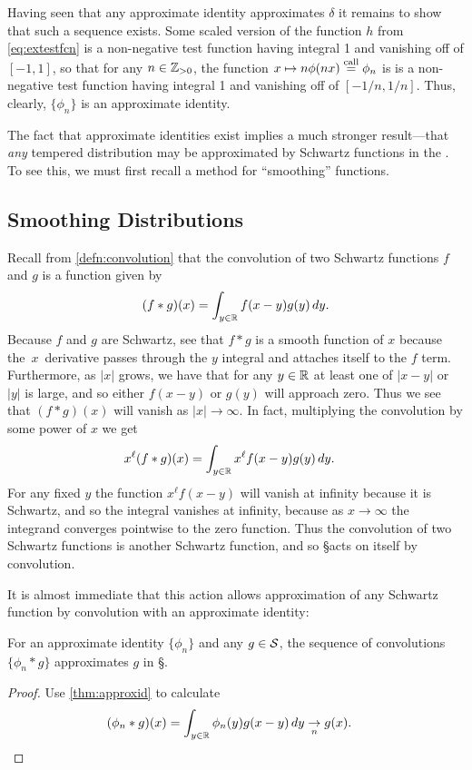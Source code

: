     Having seen that any approximate identity approximates $\delta$ it remains to show that such a sequence exists.
    Some scaled version of the function $h$ from \cref{eq:extestfcn} is a non-negative test function having integral 1 and vanishing off of $[-1,1]$, so that for any $n\in\Z_{>0}$, the function $x\mapsto n\phi(nx) \call \phi_n$ is is a non-negative test function having integral 1 and vanishing off of $[-1/n,1/n]$.
    Thus, clearly, $\{\phi_n\}$ is an approximate identity.

    The fact that approximate identities exist implies a much stronger result---that \emph{any} tempered distribution may be approximated by Schwartz functions in the \ws.
    To see this, we must first recall a method for ``smoothing'' functions.

  \subsection{Smoothing Distributions}
    Recall from \cref{defn:convolution} that the convolution of two Schwartz functions $f$ and $g$ is a function given by
    \begin{align*}
      (f*g)(x) = \int_{y\in\R} f(x-y)g(y)\,dy \text{.}
    \end{align*}
    Because $f$ and $g$ are Schwartz, see that $f*g$ is a smooth function of $x$ because the~$x$~derivative passes through the $y$ integral and attaches itself to the $f$ term.
    Furthermore, as $|x|$ grows, we have that for any $y\in\R$ at least one of $|x-y|$ or $|y|$ is large, and so either $f(x-y)$ or $g(y)$ will approach zero.
    Thus we see that $(f*g)(x)$ will vanish as $|x|\rightarrow\infty$.
    In fact, multiplying the convolution by some power of $x$ we get
    \begin{align*}
      x^\ell(f*g)(x)
      &= \int_{y\in\R} x^\ell f(x-y)g(y)\,dy \text{.}
    \end{align*}
    For any fixed $y$ the function $x^\ell f(x-y)$ will vanish at infinity because it is Schwartz, and so the integral vanishes at infinity, because as $x\rightarrow\infty$ the integrand converges pointwise to the zero function.
    Thus the convolution of two Schwartz functions is another Schwartz function, and so \S acts on itself by convolution.

    It is almost immediate that this action allows approximation of any Schwartz function by convolution with an approximate identity:
    \begin{lemma}
      \label{lemma:approxbyconv}
      For an approximate identity $\{\phi_n\}$ and any $g\in\S$, the sequence of convolutions $\{\phi_n*g\}$ approximates $g$ in \S.
    \end{lemma}
    \begin{proof}
      Use \cref{thm:approxid} to calculate
      \begin{align*}
        (\phi_n*g)(x)
        &= \int_{y\in\R} \phi_n(y)g(x-y)\,dy
        \underset{n}{\rightarrow} g(x) \text{.}
      \end{align*}
    \end{proof}

